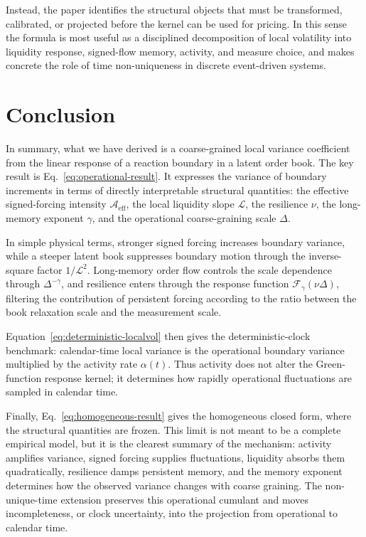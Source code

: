 \documentclass[11pt]{amsart}
\newcommand{\cL}{\mathcal{L}}
\newcommand{\Aeff}{\mathcal{A}_{\mathrm{eff}}}
\newcommand{\Fcal}{\mathcal{F}}
\theoremstyle{definition}
\theoremstyle{plain}
\theoremstyle{remark}
\begin{document}
Instead, the paper identifies the structural objects that must be transformed, calibrated, or projected before the kernel can be used for pricing. In this sense the formula is most useful as a disciplined decomposition of local volatility into liquidity response, signed-flow memory, activity, and measure choice, and makes concrete the role of time non-uniqueness in discrete event-driven systems. 


\section{Conclusion}

In summary, what we have derived is a coarse-grained local variance coefficient from the linear response of a reaction boundary in a latent order book. The key result is Eq.~\eqref{eq:operational-result}. It expresses the variance of boundary increments in terms of directly interpretable structural quantities: the effective signed-forcing intensity $\Aeff$, the local liquidity slope $\cL$, the resilience $\nu$, the long-memory exponent $\gamma$, and the operational coarse-graining scale $\Delta$.

In simple physical terms, stronger signed forcing increases boundary variance, while a steeper latent book suppresses boundary motion through the inverse-square factor $1/\cL^2$. Long-memory order flow controls the scale dependence through $\Delta^{-\gamma}$, and resilience enters through the response function $\Fcal_\gamma(\nu\Delta)$, filtering the contribution of persistent forcing according to the ratio between the book relaxation scale and the measurement scale. 

Equation~\eqref{eq:deterministic-localvol} then gives the deterministic-clock benchmark: calendar-time local variance is the operational boundary variance multiplied by the activity rate $\alpha(t)$. Thus activity does not alter the Green-function response kernel; it determines how rapidly operational fluctuations are sampled in calendar time. 

Finally, Eq.~\eqref{eq:homogeneous-result} gives the homogeneous closed form, where the structural quantities are frozen. This limit is not meant to be a complete empirical model, but it is the clearest summary of the mechanism: activity amplifies variance, signed forcing supplies fluctuations, liquidity absorbs them quadratically, resilience damps persistent memory, and the memory exponent determines how the observed variance changes with coarse graining. The non-unique-time extension preserves this operational cumulant and moves incompleteness, or clock uncertainty, into the projection from operational to calendar time.
\end{document}
